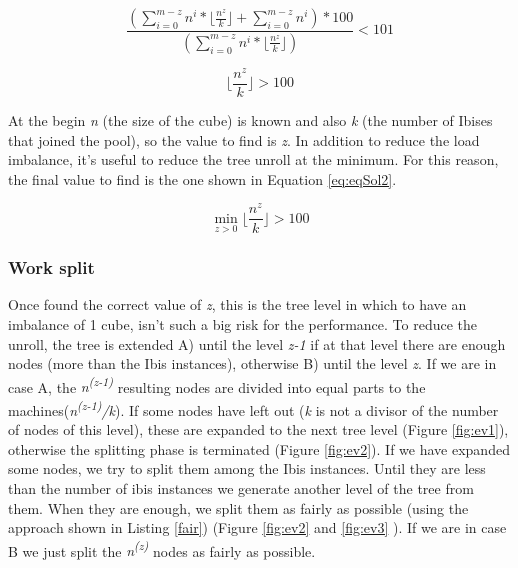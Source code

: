 \documentclass[a4paper]{article}
\begin{document}
\begin{equation} 
\label{eq:eqIne}
\frac{(\sum_{i=0}^{m-z}{n^i}*\lfloor\frac{n^z}{k}\rfloor +  \sum_{i=0}^{m-z}{n^i})*100}{(\sum_{i=0}^{m-z}{n^i}*\lfloor\frac{n^z}{k}\rfloor)} < 101
\end{equation}
\FloatBarrier

\begin{equation} 
\label{eq:eqSol}
\lfloor\frac{n^z}{k}\rfloor > 100
\end{equation}
\FloatBarrier

At the begin \textit{n} (the size of the cube) is known and also \textit{k} (the number of Ibises that joined the pool), so the value to find is \textit{z}. In addition to reduce the load imbalance, it's useful to reduce the tree unroll at the minimum. For this reason, the final value to find is the one shown in Equation \ref{eq:eqSol2}.

\begin{equation} 
\label{eq:eqSol2}
\min_{z>0} \lfloor\frac{n^z}{k}\rfloor > 100
\end{equation}
\FloatBarrier

\subsubsection{Work split}
\label{sec:ws}

Once found the correct value of \textit{z}, this is the tree level in which to have an imbalance of 1 cube, isn't such a big risk for the performance. 
To reduce the unroll, the tree is extended A) until the level \textit{z-1} if at that level there are enough nodes (more than the Ibis instances), otherwise B) until the level \textit{z}. If we are in case A, the \textit{n\textsuperscript{(z-1)}} resulting nodes are divided into equal parts to the machines(\textit{n\textsuperscript{(z-1)}/k}). If some nodes have left out (\textit{k} is not a divisor of the number of nodes of this level), these are expanded to the next tree level (Figure \ref{fig:ev1}), otherwise the splitting phase is terminated (Figure \ref{fig:ev2}). If we have expanded some nodes, we try to split them among the Ibis instances. Until they are less than the number of ibis instances we generate another level of the tree from them. When they are enough, we split them as fairly as possible (using the approach shown in Listing \ref{fair}) (Figure \ref{fig:ev2} and \ref{fig:ev3} ). If we are in case B we just split the \textit{n\textsuperscript{(z)}} nodes as fairly as possible.
\end{document}
